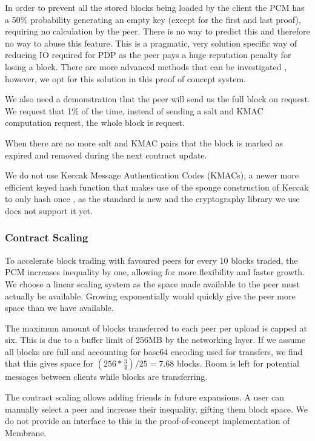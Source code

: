 \documentclass[11pt, a4paper, twoside]{report}
\begin{document}
In order to prevent all the stored blocks being loaded by the client the PCM has a 50\% probability generating an empty key (except for the first and last proof), requiring no calculation by the peer. There is no way to predict this and therefore no way to abuse this feature. This is a pragmatic, very solution specific way of reducing IO required for PDP as the peer pays a huge reputation penalty for losing a block. There are more advanced methods that can be investigated \citep*{ateniese2011remote, shacham2008compact, bowers2009proofs}, however, we opt for this solution in this proof of concept system.

We also need a demonstration that the peer will send us the full block on request. We request that 1\% of the time, instead of sending a salt and KMAC computation request, the whole block is request.

When there are no more salt and KMAC pairs that the block is marked as expired and removed during the next contract update.

We do not use Keccak Message Authentication Codes (KMACs), a newer more efficient keyed hash function that makes use of the sponge construction of Keccak to only hash once \citep{kelsey2016sha}, as the standard is new and the cryptography library we use does not support it yet.

\subsubsection{Contract Scaling}

To accelerate block trading with favoured peers for every 10 blocks traded, the PCM increases inequality by one, allowing for more flexibility and faster growth. We choose a linear scaling system as the space made available to the peer must actually be available. Growing exponentially would quickly give the peer more space than we have available. 

The maximum amount of blocks transferred to each peer per upload is capped at six. This is due to a buffer limit of 256MB by the networking layer. If we assume all blocks are full and accounting for base64 encoding used for transfers, we find that this gives space for $(256 * \frac{3}{4}) / 25 = 7.68$ blocks. Room is left for potential messages between clients while blocks are transferring.

The contract scaling allows adding friends in future expansions. A user can manually select a peer and increase their inequality, gifting them block space. We do not provide an interface to this in the proof-of-concept implementation of Membrane.
\end{document}
